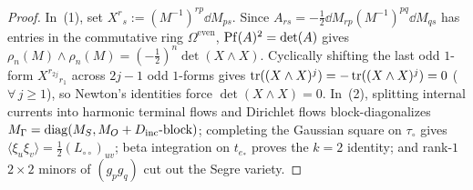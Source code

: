 \begin{proof}
In~(1), set $X^r{}_s := (M^{-1})^{rp}\dd M_{ps}$. Since $A_{rs} = -\frac{1}{2}\dd M_{rp}(M^{-1})^{pq}\dd M_{qs}$ has entries in the commutative ring $\Omega^{\mathrm{even}}$, $\operatorname{Pf}(A)^2 = \det(A)$ gives $\rho_n(M)\wedge\rho_n(M) = (-\frac{1}{2})^n\det(X\wedge X)$. Cyclically shifting the last odd $1$-form $X^{r_{2j}}{}_{r_1}$ across $2j-1$ odd $1$-forms gives $\operatorname{tr}((X\wedge X)^j) = -\operatorname{tr}((X\wedge X)^j) = 0$ ($\forall\,j\ge 1$), so Newton's identities force $\det(X\wedge X) = 0$. In~(2), splitting internal currents into harmonic terminal flows and Dirichlet flows block-diagonalizes $M_\Gamma = \operatorname{diag}(M_S, M_O + D_{\mathrm{inc}}\text{-block})$; completing the Gaussian square on $\tau_\circ$ gives $\langle\xi_u\xi_v\rangle = \frac{1}{2}(L_{\circ\circ})_{uv}$; beta integration on $t_{e_*}$ proves the $k=2$ identity; and rank-$1$ $2\times 2$ minors of $(g_p g_q)$ cut out the Segre variety.
\end{proof}

